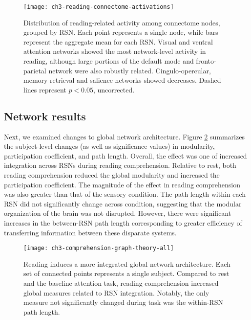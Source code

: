 \begin{figure}[t]
	\centering
	\texttt{[image: ch3-reading-connectome-activations]}
    \caption[Distribution of reading-related activity among RSN nodes.]{Distribution of reading-related activity among connectome nodes, grouped by RSN. Each point represents a single node, while bars represent the aggregate mean for each RSN. Visual and ventral attention networks showed the most network-level activity in reading, although large portions of the default mode and fronto-parietal network were also robustly related. Cingulo-opercular, memory retrieval and salience networks showed decreases. Dashed lines represent $p < 0.05$, uncorrected.}
	\label{fig:ch3-reading-connectome-activations}
\end{figure}


\subsection{Network results}

Next, we examined changes to global network architecture. Figure \ref{fig:ch3-comprehension-graph-theory-all} summarizes the subject-level changes (as well as significance values) in modularity, participation coefficient, and path length. Overall, the effect was one of increased integration across RSNs during reading comprehension. Relative to rest, both reading comprehension reduced the global modularity and increased the participation coefficient. The magnitude of the effect in reading comprehension was also greater than that of the sensory condition. The path length within each RSN did not significantly change across condition, suggesting that the modular organization of the brain was not disrupted.  However, there were significant increases in the between-RSN path length corresponding to greater efficiency of transferring information between these disparate systems.

\begin{figure}[t!]
	\centering
	\texttt{[image: ch3-comprehension-graph-theory-all]}
    \caption[Reading induces a more integrated global network architecture.]{Reading induces a more integrated global network architecture. Each set of connected points represents a single subject. Compared to rest and the baseline attention task, reading comprehension increased global measures related to RSN integration. Notably, the only measure not significantly changed during task was the within-RSN path length.}
	\label{fig:ch3-comprehension-graph-theory-all}
\end{figure}

